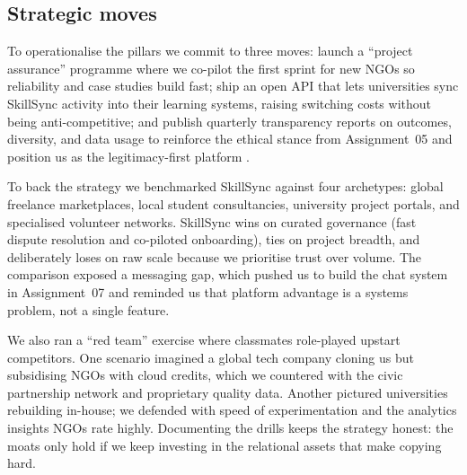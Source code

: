 \subsection*{Strategic moves}
To operationalise the pillars we commit to three moves: launch a ``project assurance'' programme where we co-pilot the first sprint for new NGOs so reliability and case studies build fast; ship an open API that lets universities sync SkillSync activity into their learning systems, raising switching costs without being anti-competitive; and publish quarterly transparency reports on outcomes, diversity, and data usage to reinforce the ethical stance from Assignment~05 and position us as the legitimacy-first platform \citep{Srnicek2017,Zuboff2019}.

To back the strategy we benchmarked SkillSync against four archetypes: global freelance marketplaces, local student consultancies, university project portals, and specialised volunteer networks. SkillSync wins on curated governance (fast dispute resolution and co-piloted onboarding), ties on project breadth, and deliberately loses on raw scale because we prioritise trust over volume. The comparison exposed a messaging gap, which pushed us to build the chat system in Assignment~07 and reminded us that platform advantage is a systems problem, not a single feature.

We also ran a ``red team'' exercise where classmates role-played upstart competitors. One scenario imagined a global tech company cloning us but subsidising NGOs with cloud credits, which we countered with the civic partnership network and proprietary quality data. Another pictured universities rebuilding in-house; we defended with speed of experimentation and the analytics insights NGOs rate highly. Documenting the drills keeps the strategy honest: the moats only hold if we keep investing in the relational assets that make copying hard.

